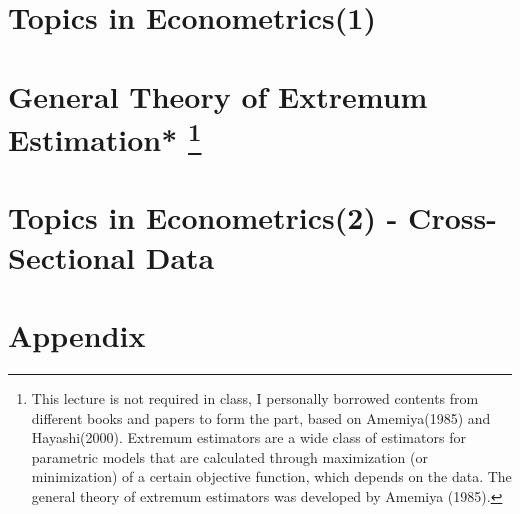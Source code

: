 \documentclass[a4paper]{report}
\begin{document}
\chapter{Topics in Econometrics(1)}

\chapter{General Theory of Extremum Estimation* \protect\footnote{This lecture is not required in class, I personally borrowed contents from different books and papers to form the part, based on Amemiya(1985)\cite{amemiya1985advanced} and Hayashi(2000)\cite{hayashi2000econometrics}. Extremum estimators are a wide class of estimators for parametric models that are calculated through maximization (or minimization) of a certain objective function, which depends on the data. The general theory of extremum estimators was developed by Amemiya (1985)\cite{amemiya1985advanced}.}}

\chapter{Topics in Econometrics(2) - Cross-Sectional Data}



\chapter*{Appendix}

\nocite{*} %


\end{document}
